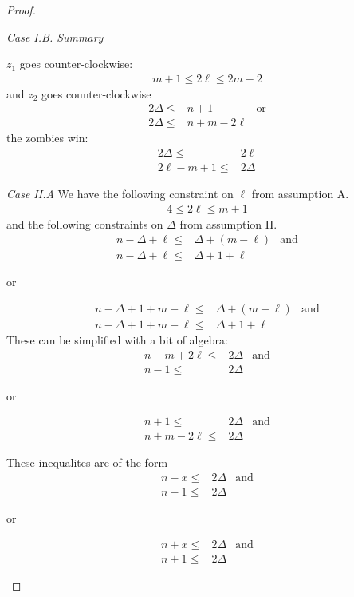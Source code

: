 \begin{proof}
\begin{proofpart}
  \textit{Case I.B. Summary}

  $z_1$ goes counter-clockwise:
  \begin{align*}
   m + 1 \leq 2 \ell \leq 2m - 2
  \end{align*}
  and $z_2$ goes counter-clockwise
  \begin{align*}
   2 \Delta \leq & n + 1         & \text{or} \\
   2 \Delta \leq & n + m - 2\ell
  \end{align*}
  the zombies win:
  \begin{align*}
   2 \Delta \leq      & 2 \ell   \\
   2\ell - m + 1 \leq & 2 \Delta
  \end{align*}

  \textit{Case II.A} We have the following constraint on $\ell$ from
  assumption A.
  \begin{align*}
   4 \leq 2 \ell \leq m + 1
  \end{align*}
  and the following constraints on $\Delta$ from assumption II.
  \begin{align*}
   n - \Delta + \ell \leq & \Delta + (m - \ell) & \text{and} \\
   n - \Delta + \ell \leq & \Delta + 1 + \ell
  \end{align*}
  \begin{center}or\end{center}
  \begin{align*}
   n - \Delta + 1 + m - \ell \leq & \Delta + (m - \ell) & \text{and} \\
   n - \Delta + 1 + m - \ell \leq & \Delta + 1 + \ell
  \end{align*}
  These can be simplified with a bit of algebra:
  \begin{align*}
   n-m +2\ell \leq & 2 \Delta & \text{and} \\
   n-1 \leq        & 2\Delta
  \end{align*}
  \begin{center}or\end{center}
  \begin{align*}
   n + 1 \leq         & 2 \Delta & \text{and} \\
   n + m - 2\ell \leq & 2 \Delta
  \end{align*}

  These inequalites are of the form
  \begin{align*}
   n-x \leq & 2 \Delta & \text{and} \\
   n-1 \leq & 2\Delta
  \end{align*}
  \begin{center}or\end{center}
  \begin{align*}
   n + x \leq & 2 \Delta & \text{and} \\
   n + 1 \leq & 2 \Delta
  \end{align*}


\end{proofpart}
\end{proof}
